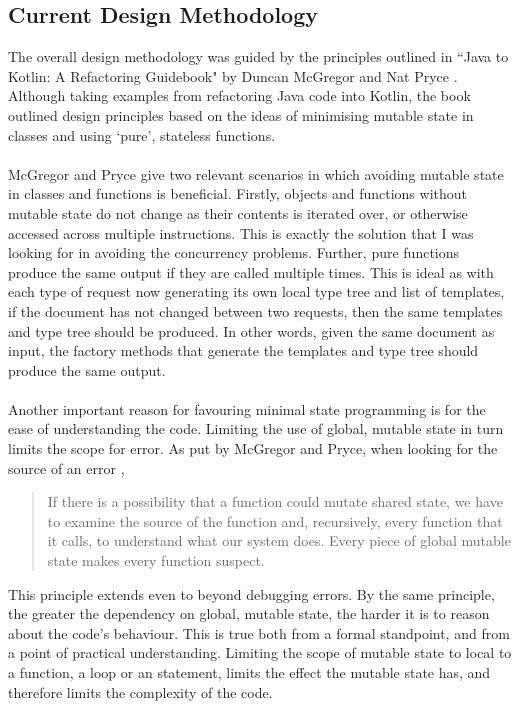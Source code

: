\documentclass[../main.tex]{subfiles}
\begin{document}
\subsection{Current Design Methodology}
The overall design methodology was guided by the principles outlined in ``Java to Kotlin: A Refactoring Guidebook" by Duncan McGregor and Nat Pryce \cite{java_to_kotlin_stateless}. Although taking examples from refactoring Java code into Kotlin, the book outlined design principles based on the ideas of minimising mutable state in classes and using `pure', stateless functions. 
\\
\\
McGregor and Pryce give two relevant scenarios in which avoiding mutable state in classes and functions is beneficial. Firstly, objects and functions without mutable state do not change as their contents is iterated over, or otherwise accessed across multiple instructions. \cite{java_to_kotlin_stateless} This is exactly the solution that I was looking for in avoiding the concurrency problems. Further, pure functions produce the same output if they are called multiple times\cite{java_to_kotlin_pure_functions}. This is ideal as with each type of request now generating its own local type tree and list of templates, if the document has not changed between two requests, then the same templates and type tree should be produced. In other words, given the same document as input, the factory methods that generate the templates and type tree should produce the same output.
\\
\\
Another important reason for favouring minimal state programming is for the ease of understanding the code. Limiting the use of global, mutable state in turn limits the scope for error. As put by McGregor and Pryce, when looking for the source of an error \cite{java_to_kotlin_error}, 
\begin{quote}
    If there is a possibility that a function could mutate shared state, we have to examine the source of the function and, recursively, every function that it calls, to understand what our system does. Every piece of global mutable state makes every function suspect.
\end{quote}
This principle extends even to beyond debugging errors. By the same principle, the greater the dependency on global, mutable state, the harder it is to reason about the code's behaviour. This is true both from a formal standpoint, and from a point of practical understanding. Limiting the scope of mutable state to local to a function, a  loop or an  statement, limits the effect the mutable state has, and therefore limits the complexity of the code.
\end{document}
